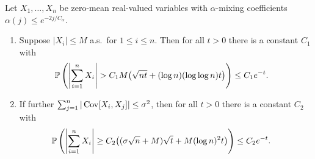 \begin{lemma}
  \label{lem:yurinskii_app_exponential_mixing}

  Let $X_1, \ldots, X_n$ be zero-mean real-valued
  variables with $\alpha$-mixing coefficients
  $\alpha(j) \leq e^{-2 j / C_\alpha}$.

  \begin{enumerate}[label=(\roman*)]

    \item
      \label{it:yurinskii_app_exponential_mixing_bounded}
      Suppose $|X_i| \leq M$ a.s.\ for $1 \leq i \leq n$.
      Then for all $t > 0$ there is a constant $C_1$ with
      \begin{align*}
        \P\left(
          \left|
          \sum_{i=1}^n
          X_i
          \right|
          > C_1 M \big( \sqrt{n t}
          + (\log n)(\log \log n) t \big)
        \right)
        &\leq
        C_1 e^{-t}.
      \end{align*}
    \item
      \label{it:yurinskii_app_exponential_mixing_bernstein}
      If further $\sum_{j=1}^n |\Cov[X_i, X_j]| \leq \sigma^2$,
      then for all $t > 0$ there is a constant $C_2$ with
      \begin{align*}
        \P\left(
          \left|
          \sum_{i=1}^n
          X_i
          \right|
          \geq C_2 \big( (\sigma \sqrt n + M) \sqrt t
          + M (\log n)^2 t \big)
        \right)
        &\leq
        C_2 e^{-t}.
      \end{align*}

  \end{enumerate}

\end{lemma}

